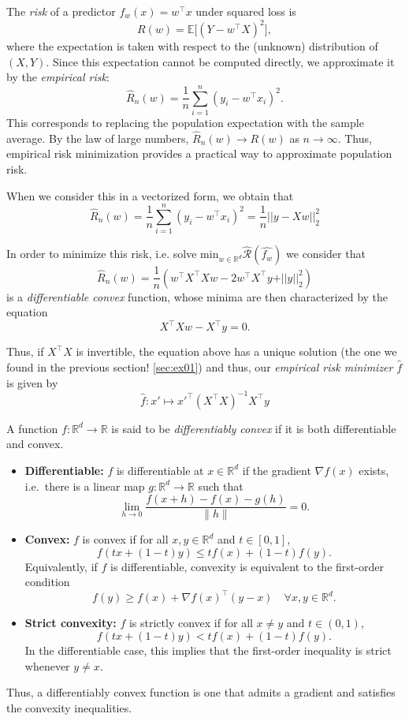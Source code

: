 \begin{remark}
The \emph{risk} of a predictor $f_w(x) = w^\top x$ under squared loss is
\[
R(w) = \mathbb{E}\big[(Y - w^\top X)^2\big],
\]
where the expectation is taken with respect to the (unknown) distribution of $(X,Y)$.
Since this expectation cannot be computed directly, we approximate it by the
\emph{empirical risk}:
\[
\hat R_n(w) = \frac{1}{n}\sum_{i=1}^n (y_i - w^\top x_i)^2.
\]
This corresponds to replacing the population expectation with the sample average.
By the law of large numbers, $\hat R_n(w) \to R(w)$ as $n \to \infty$.
Thus, empirical risk minimization provides a practical way to approximate
population risk.
\end{remark}

When we consider this in a vectorized form, we obtain that
$$\hat R_n(w) = \frac{1}{n}\sum_{i=1}^n (y_i - w^\top x_i)^2 = \frac{1}{n} \vert \vert {y - Xw}\vert \vert_2^2$$

In order to minimize this risk, i.e. solve $\text{min}_{w \in \mathbb{R}^d} \hat{\mathcal{R}}(\hat{f_w})$ we consider that 
$$\hat R_n(w) = \frac{1}{n} \left( w^\top X^\top X w - 2 w^\top X^\top y + \vert \vert y \vert \vert_2^2 \right)$$
is a \textit{differentiable convex} function, whose minima are then characterized by the equation $$X^\top X w - X^\top y = 0.$$

Thus, if $X^\top X$ is invertible, the equation above has a unique solution (the one we found in the previous section! \ref{sec:ex01}) and thus, our \textit{empirical risk minimizer} $\hat f$ is given by 
$$\hat f : x \prime \mapsto x\prime^\top\left(X^\top X\right)^{-1}X^\top y$$

\begin{definition}
A function $f : \mathbb{R}^d \to \mathbb{R}$ is said to be \emph{differentiably convex}
if it is both differentiable and convex.

\begin{itemize}
  \item \textbf{Differentiable:} $f$ is differentiable at $x\in\mathbb{R}^d$ if the gradient
  $\nabla f(x)$ exists, i.e.\ there is a linear map $g:\mathbb{R}^d\to\mathbb{R}$ such that
  \[
  \lim_{h\to 0}\frac{f(x+h)-f(x)-g(h)}{\|h\|}=0.
  \]

  \item \textbf{Convex:} $f$ is convex if for all $x,y\in\mathbb{R}^d$ and $t\in[0,1]$,
  \[
  f(tx+(1-t)y)\leq t f(x)+(1-t)f(y).
  \]
  Equivalently, if $f$ is differentiable, convexity is equivalent to the first-order condition
  \[
  f(y)\geq f(x) + \nabla f(x)^\top (y-x)\quad \forall x,y\in\mathbb{R}^d.
  \]

  \item \textbf{Strict convexity:} $f$ is strictly convex if for all $x\neq y$ and $t\in(0,1)$,
  \[
  f(tx+(1-t)y) < t f(x)+(1-t)f(y).
  \]
  In the differentiable case, this implies that the first-order inequality is strict whenever $y\neq x$.
\end{itemize}

Thus, a differentiably convex function is one that admits a gradient and satisfies the convexity inequalities.
\end{definition}


